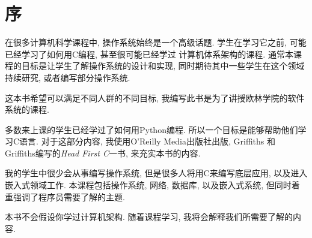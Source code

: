 \documentclass[12pt]{book}
\begin{document}
\chapter{序}
\label{preface}

在很多计算机科学课程中, 操作系统始终是一个高级话题.
学生在学习它之前, 可能已经学习了如何用C编程, 甚至很可能已经学过
计算机体系架构的课程. 通常本课程的目标是让学生了解操作系统的设计和实现,
同时期待其中一些学生在这个领域持续研究, 或者编写部分操作系统.

这本书希望可以满足不同人群的不同目标, 
我编写此书是为了讲授欧林学院的软件系统的课程.

多数来上课的学生已经学过了如何用Python编程.
所以一个目标是能够帮助他们学习C语言.
对于这部分内容, 我使用O'Reilly Media出版社出版, 
Griffiths 和 Griffiths编写的{\it Head First C}一书,
来充实本书的内容.

我的学生中很少会从事编写操作系统, 但是很多人将用C来编写底层应用, 
以及进入嵌入式领域工作. 本课程包括操作系统, 网络, 数据库, 以及嵌入式系统,
但同时着重强调了程序员需要了解的主题.

本书不会假设你学过计算机架构.
随着课程学习, 我将会解释我们所需要了解的内容.
\end{document}
